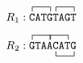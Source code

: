 \documentclass[12pt]{article}
\begin{document}
$R_1: \contraction{}{\tt C}{\tt AT}{\tt G}%
\contraction{\tt CATG}{\tt T}{\tt AG}{\tt T}%
{\tt CATGTAGT}$

$R_2: \contraction{}{\tt G}{\tt TA}{\tt A}%
\contraction{\tt GTA}{\tt A}{\tt CA}{\tt T}%
\bcontraction{\tt GTAA}{\tt C}{\tt AT}{\tt G}%
{\tt GTAACATG}$

\end{document}
